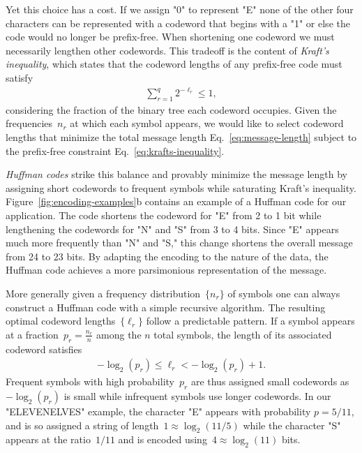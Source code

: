 Yet this choice has a cost. If we assign "0" to represent "E" none of the other four characters can be represented with a codeword that begins with a "1" or else the code would no longer be prefix-free. When shortening one codeword we must necessarily lengthen other codewords. This tradeoff is the content of \emph{Kraft's inequality}, which states that the codeword lengths of any prefix-free code must satisfy \begin{align}
    \sum_{r=1}^q 2^{-\ell_r} \leq 1, \label{eq:krafts-inequality}
\end{align}
considering the fraction of the binary tree each codeword occupies. Given the frequencies~$n_r$ at which each symbol appears, we would like to select codeword lengths that minimize the total message length Eq.~\eqref{eq:message-length} subject to the prefix-free constraint Eq.~\eqref{eq:krafts-inequality}.

\emph{Huffman codes} strike this balance and provably minimize the message length by assigning short codewords to frequent symbols while saturating Kraft's inequality. Figure~\ref{fig:encoding-examples}b contains an example of a Huffman code for our application. The code shortens the codeword for "E" from 2 to 1 bit while lengthening the codewords for "N" and "S" from 3 to 4 bits. Since "E" appears much more frequently than "N" and "S," this change shortens the overall message from 24 to 23 bits. By adapting the encoding to the nature of the data, the Huffman code achieves a more parsimonious representation of the message.

More generally given a frequency distribution~$\{n_r\}$ of symbols one can always construct a Huffman code with a simple recursive algorithm. The resulting optimal codeword lengths~$\{\ell_r\}$ follow a predictable pattern. If a symbol appears at a fraction~$p_r = \frac{n_r}{n}$ among the $n$ total symbols, the length of its associated codeword satisfies \begin{align}
      -\log_2(p_r) \leq \ell_r < -\log_2(p_r) + 1.
\end{align} 
Frequent symbols with high probability~$p_r$ are thus assigned small codewords as~$-\log_2(p_r)$ is small while infrequent symbols use longer codewords. In our "ELEVENELVES" example, the character "E" appears with probability $p = 5/11$, and is so assigned a string of length~$1 \approx \log_2(11/5)$ while the character "S" appears at the ratio~$1/11$ and is encoded using~$4 \approx \log_2(11)$ bits. 

